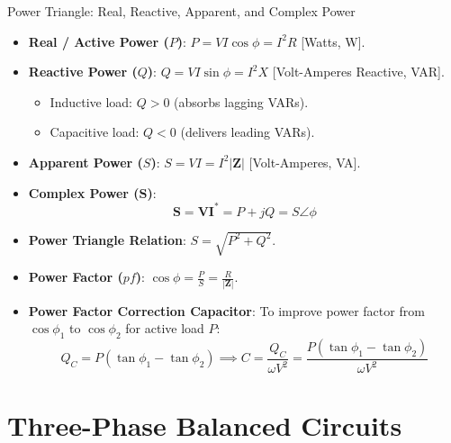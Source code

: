 \begin{formulabox}{Power Triangle: Real, Reactive, Apparent, and Complex Power}
\begin{itemize}[leftmargin=1.5em]
    \item \textbf{Real / Active Power ($P$)}: $P = V I \cos\phi = I^2 R$ [Watts, W].
    \item \textbf{Reactive Power ($Q$)}: $Q = V I \sin\phi = I^2 X$ [Volt-Amperes Reactive, VAR].
    \begin{itemize}
        \item Inductive load: $Q > 0$ (absorbs lagging VARs).
        \item Capacitive load: $Q < 0$ (delivers leading VARs).
    \end{itemize}
    \item \textbf{Apparent Power ($S$)}: $S = V I = I^2 |\mathbf{Z}|$ [Volt-Amperes, VA].
    \item \textbf{Complex Power ($\mathbf{S}$)}:
    \[ \mathbf{S} = \mathbf{V}\mathbf{I}^* = P + jQ = S \angle \phi \]
    \item \textbf{Power Triangle Relation}: $S = \sqrt{P^2 + Q^2}$.
    \item \textbf{Power Factor ($pf$)}: $\cos\phi = \frac{P}{S} = \frac{R}{|\mathbf{Z}|}$.
    \item \textbf{Power Factor Correction Capacitor}:
    To improve power factor from $\cos\phi_1$ to $\cos\phi_2$ for active load $P$:
    \[ Q_C = P(\tan\phi_1 - \tan\phi_2) \implies C = \frac{Q_C}{\omega V^2} = \frac{P(\tan\phi_1 - \tan\phi_2)}{\omega V^2} \]
\end{itemize}
\end{formulabox}

\section{Three-Phase Balanced Circuits}

